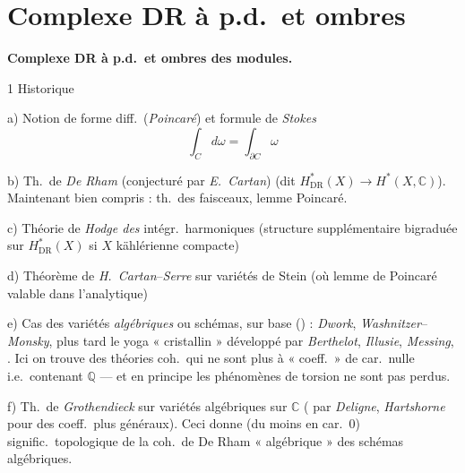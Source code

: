 \documentclass[11pt,a4paper]{article}
\begin{document}
\section{Complexe DR à p.d.\ et ombres}

\textbf{Complexe DR à p.d.\ et ombres des modules.}

1 \quad Historique

a) Notion de forme diff.\ (\emph{Poincaré}) et formule de \emph{Stokes}
\[ \int_C d\omega = \int_{\partial C} \omega \]

b) Th.\ de \emph{De Rham} (conjecturé par \emph{E.~Cartan}) (dit $H^*_{\mathrm{DR}}(X) \to H^*(X,\mathbb{C})$).  Maintenant bien compris : th.\ des faisceaux, lemme Poincaré.

c) Théorie de \emph{Hodge des} intégr.\ harmoniques (structure supplémentaire bigraduée sur $H^*_{\mathrm{DR}}(X)$ si $X$ kählérienne compacte)

d) Théorème de \emph{H.~Cartan}–\emph{Serre} sur variétés de Stein (où lemme de Poincaré valable dans l'analytique)

e) Cas des variétés \emph{algébriques} ou schémas, sur  base \ill{} () : \emph{Dwork}, \emph{Washnitzer}–\emph{Monsky}, plus tard le yoga « cristallin » développé par \emph{Berthelot}, \emph{Illusie}, \emph{Messing},  \struck{\ill{}}.
Ici on trouve des théories coh.\ qui ne sont plus à « coeff.\ » de car.\ nulle i.e.\ contenant $\mathbb{Q}$ — et en principe les phénomènes de torsion ne sont pas perdus.

f) Th.\ de \emph{Grothendieck} sur variétés algébriques sur $\mathbb{C}$ (\struck{\ill{}}  par \emph{Deligne}, \emph{Hartshorne} pour des coeff.\ plus généraux). Ceci donne  (du moins en car.\ 0)  signific.\ topologique de la coh.\ de De Rham « algébrique » des schémas algébriques.
\end{document}

